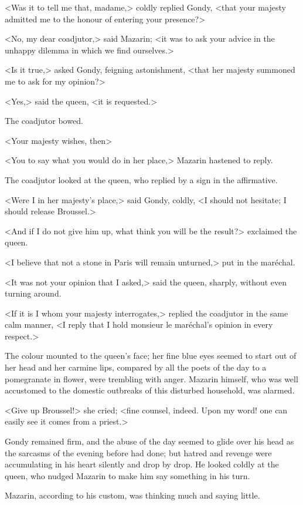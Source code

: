 <Was it to tell me that, madame,> coldly replied Gondy, <that your majesty admitted me to the honour of entering your presence?>

<No, my dear coadjutor,> said Mazarin; <it was to ask your advice in the unhappy dilemma in which we find ourselves.>

<Is it true,> asked Gondy, feigning astonishment, <that her majesty summoned me to ask for my opinion?>

<Yes,> said the queen, <it is requested.>

The coadjutor bowed.

<Your majesty wishes, then\longdash>

<You to say what you would do in her place,> Mazarin hastened to reply.

The coadjutor looked at the queen, who replied by a sign in the affirmative.

<Were I in her majesty's place,> said Gondy, coldly, <I should not hesitate; I should release Broussel.>

<And if I do not give him up, what think you will be the result?> exclaimed the queen.

<I believe that not a stone in Paris will remain unturned,> put in the maréchal.

<It was not your opinion that I asked,> said the queen, sharply, without even turning around.

<If it is I whom your majesty interrogates,> replied the coadjutor in the same calm manner, <I reply that I hold monsieur le maréchal's opinion in every respect.>

The colour mounted to the queen's face; her fine blue eyes seemed to start out of her head and her carmine lips, compared by all the poets of the day to a pomegranate in flower, were trembling with anger. Mazarin himself, who was well accustomed to the domestic outbreaks of this disturbed household, was alarmed.

<Give up Broussel!> she cried; <fine counsel, indeed. Upon my word! one can easily see it comes from a priest.>

Gondy remained firm, and the abuse of the day seemed to glide over his head as the sarcasms of the evening before had done; but hatred and revenge were accumulating in his heart silently and drop by drop. He looked coldly at the queen, who nudged Mazarin to make him say something in his turn.

Mazarin, according to his custom, was thinking much and saying little.

